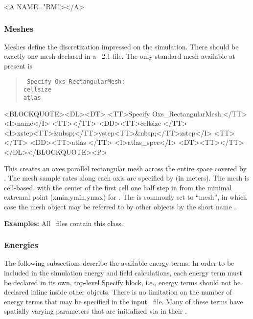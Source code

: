 \begin{rawhtml}<A NAME="RM"></A>\end{rawhtml}%
\subsubsection{Meshes}\label{sec:Meshes}
Meshes define the discretization impressed on the simulation.  There
should be exactly one mesh declared in a \MIF~2.1 file.  The only
standard mesh available at present is
\begin{latexonly}
\begin{quote}\tt
Specify Oxs\_RectangularMesh: \ocb \\
\bi cellsize \ocb{}\ccb\\
\bi atlas \\
\ccb
\end{quote}
\end{latexonly}
\begin{rawhtml}<BLOCKQUOTE><DL><DT>
<TT>Specify Oxs_RectangularMesh:</TT><I>name</I> <TT>{</TT>
<DD><TT>cellsize {</TT>
  <I>xstep<TT>&nbsp;</TT>ystep<TT>&nbsp;</TT>zstep</I>
  <TT>}</TT>
<DD><TT>atlas </TT> <I>atlas_spec</I>
<DT><TT>}</TT></DL></BLOCKQUOTE><P>
\end{rawhtml}
This creates an axes parallel rectangular mesh across the entire space
covered by .  The mesh sample rates along each axis are
specified by  (in meters).  The mesh is
cell-based, with the center of the first cell one half step in from the
minimal extremal point (xmin,ymin,ymax) for .
The  is commonly set to ``mesh'', in which case the mesh
object may be referred to by other  objects by the short
name .

\textbf{Examples:} All \MIF\ files contain this class.

\subsubsection{Energies}
The following subsections describe the available energy terms.  In
order to be included in the simulation energy and field calculations,
each energy term must be declared in its own, top-level Specify block,
i.e., energy terms should not be declared inline inside other
 objects.  There is no limitation on the number of energy
terms that may be specified in the input \MIF\ file.  Many of these
terms have spatially varying parameters that are initialized via
 in their
.

